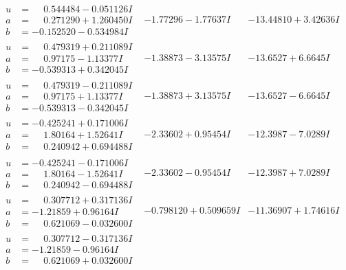 \documentclass[1p]{elsarticle_modified}
\theoremstyle{definition}
\begin{document}
$$\begin{array}{c|c|c}
\begin{aligned}
u &= \phantom{-}0.544484 - 0.051126 I \\
a &= \phantom{-}0.271290 + 1.260450 I \\
b &= -0.152520 - 0.534984 I\end{aligned}
 & -1.77296 - 1.77637 I & -13.44810 + 3.42636 I \\ \hline\begin{aligned}
u &= \phantom{-}0.479319 + 0.211089 I \\
a &= \phantom{-}0.97175 - 1.13377 I \\
b &= -0.539313 + 0.342045 I\end{aligned}
 & -1.38873 - 3.13575 I & -13.6527 + 6.6645 I \\ \hline\begin{aligned}
u &= \phantom{-}0.479319 - 0.211089 I \\
a &= \phantom{-}0.97175 + 1.13377 I \\
b &= -0.539313 - 0.342045 I\end{aligned}
 & -1.38873 + 3.13575 I & -13.6527 - 6.6645 I \\ \hline\begin{aligned}
u &= -0.425241 + 0.171006 I \\
a &= \phantom{-}1.80164 + 1.52641 I \\
b &= \phantom{-}0.240942 + 0.694488 I\end{aligned}
 & -2.33602 + 0.95454 I & -12.3987 - 7.0289 I \\ \hline\begin{aligned}
u &= -0.425241 - 0.171006 I \\
a &= \phantom{-}1.80164 - 1.52641 I \\
b &= \phantom{-}0.240942 - 0.694488 I\end{aligned}
 & -2.33602 - 0.95454 I & -12.3987 + 7.0289 I \\ \hline\begin{aligned}
u &= \phantom{-}0.307712 + 0.317136 I \\
a &= -1.21859 + 0.96164 I \\
b &= \phantom{-}0.621069 - 0.032600 I\end{aligned}
 & -0.798120 + 0.509659 I & -11.36907 + 1.74616 I \\ \hline\begin{aligned}
u &= \phantom{-}0.307712 - 0.317136 I \\
a &= -1.21859 - 0.96164 I \\
b &= \phantom{-}0.621069 + 0.032600 I\end{aligned}

\end{array}$$
\end{document}
